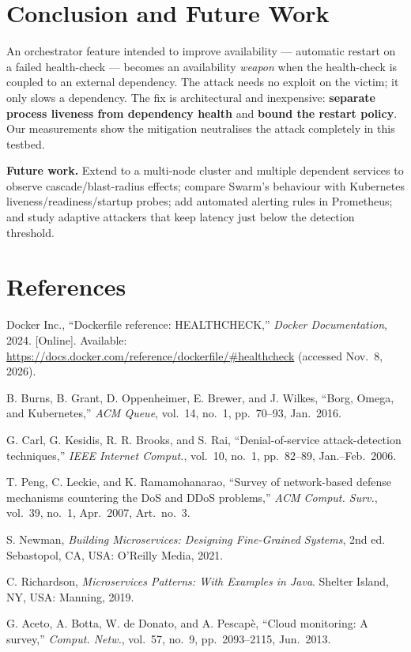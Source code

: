 \documentclass[11pt]{article}
\begin{document}
\section{Conclusion and Future Work}

An orchestrator feature intended to improve availability --- automatic restart
on a failed health-check --- becomes an availability \emph{weapon} when the
health-check is coupled to an external dependency. The attack needs no exploit on
the victim; it only slows a dependency. The fix is architectural and
inexpensive: \textbf{separate process liveness from dependency health} and
\textbf{bound the restart policy}. Our measurements show the mitigation
neutralises the attack completely in this testbed.

\textbf{Future work.} Extend to a multi-node cluster and multiple dependent
services to observe cascade/blast-radius effects; compare Swarm's behaviour with
Kubernetes liveness/readiness/startup probes; add automated alerting rules in
Prometheus; and study adaptive attackers that keep latency just below the
detection threshold.

\section{References}

\begin{enumerate}[label={[\arabic*]},leftmargin=2.4em,labelsep=0.4em,itemsep=4pt]
\item Docker Inc., ``Dockerfile reference: HEALTHCHECK,'' \emph{Docker Documentation}, 2024. [Online]. Available: \url{https://docs.docker.com/reference/dockerfile/#healthcheck} (accessed Nov.~8, 2026).
\item B. Burns, B. Grant, D. Oppenheimer, E. Brewer, and J. Wilkes, ``Borg, Omega, and Kubernetes,'' \emph{ACM Queue}, vol.~14, no.~1, pp.~70--93, Jan.~2016.
\item G. Carl, G. Kesidis, R. R. Brooks, and S. Rai, ``Denial-of-service attack-detection techniques,'' \emph{IEEE Internet Comput.}, vol.~10, no.~1, pp.~82--89, Jan.--Feb.~2006.
\item T. Peng, C. Leckie, and K. Ramamohanarao, ``Survey of network-based defense mechanisms countering the DoS and DDoS problems,'' \emph{ACM Comput. Surv.}, vol.~39, no.~1, Apr.~2007, Art.~no.~3.
\item S. Newman, \emph{Building Microservices: Designing Fine-Grained Systems}, 2nd ed. Sebastopol, CA, USA: O'Reilly Media, 2021.
\item C. Richardson, \emph{Microservices Patterns: With Examples in Java}. Shelter Island, NY, USA: Manning, 2019.
\item G. Aceto, A. Botta, W. de Donato, and A. Pescap\`{e}, ``Cloud monitoring: A survey,'' \emph{Comput. Netw.}, vol.~57, no.~9, pp.~2093--2115, Jun.~2013.
\end{enumerate}
\end{document}

